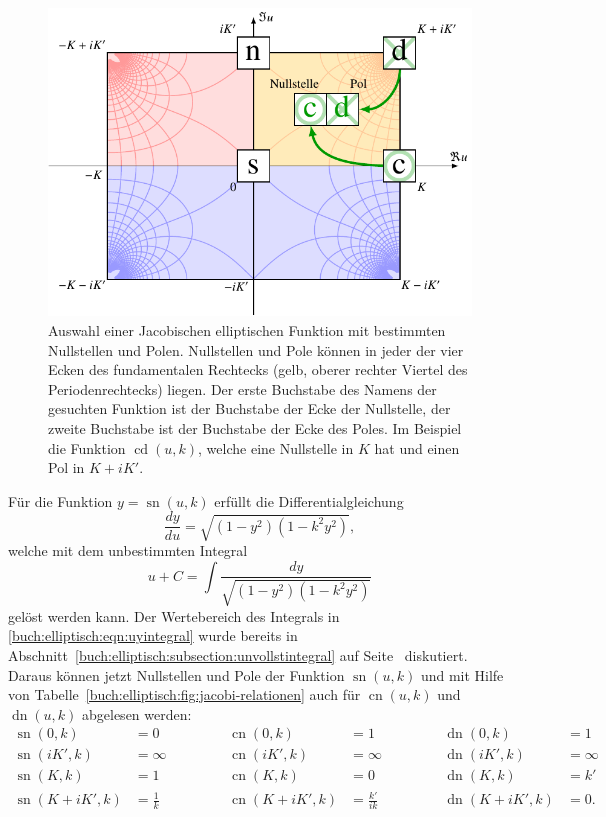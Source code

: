 \begin{figure}
\centering
\includegraphics{chapters/110-elliptisch/images/ellselection.pdf}
\caption{Auswahl einer Jacobischen elliptischen Funktion mit bestimmten
Nullstellen und Polen.
Nullstellen und Pole können in jeder der vier Ecken des fundamentalen
Rechtecks (gelb, oberer rechter Viertel des Periodenrechtecks) liegen.
Der erste Buchstabe des Namens der gesuchten Funktion ist der Buchstabe
der Ecke der Nullstelle, der zweite Buchstabe ist der Buchstabe der
Ecke des Poles.
Im Beispiel die Funktion $\operatorname{cd}(u,k)$, welche eine
Nullstelle in $K$ hat und einen Pol in $K+iK'$.
\label{buch:elliptisch:fig:selectell}}
\end{figure}
Für die Funktion $y=\operatorname{sn}(u,k)$ erfüllt die Differentialgleichung
\[
\frac{dy}{du}
=
\sqrt{(1-y^2)(1-k^2y^2)},
\]
welche mit dem unbestimmten Integral
\begin{equation}
u + C = \int\frac{dy}{\sqrt{(1-y^2)(1-k^2y^2)}}
\label{buch:elliptisch:eqn:uyintegral}
\end{equation}
gelöst werden kann.
Der Wertebereich des Integrals in \eqref{buch:elliptisch:eqn:uyintegral}
wurde bereits in
Abschnitt~\ref{buch:elliptisch:subsection:unvollstintegral}
auf Seite~\pageref{buch:elliptische:subsubsection:wertebereich}
diskutiert.
Daraus können jetzt Nullstellen und Pole der Funktion $\operatorname{sn}(u,k)$
und mit Hilfe von Tabelle~\ref{buch:elliptisch:fig:jacobi-relationen}
auch für $\operatorname{cn}(u,k)$ und $\operatorname{dn}(u,k)$
abgelesen werden:
\begin{equation}
\begin{aligned}
\operatorname{sn}(0,k)&=0
&&\qquad&
\operatorname{cn}(0,k)&=1
&&\qquad&
\operatorname{dn}(0,k)&=1
\\
\operatorname{sn}(iK',k)&=\infty
&&\qquad&
\operatorname{cn}(iK',k)&=\infty
&&\qquad&
\operatorname{dn}(iK',k)&=\infty
\\
\operatorname{sn}(K,k)&=1
&&\qquad&
\operatorname{cn}(K,k)&=0
&&\qquad&
\operatorname{dn}(K,k)&=k'
\\
\operatorname{sn}(K+iK',k)&=\frac{1}{k}
&&\qquad&
\operatorname{cn}(K+iK',k)&=\frac{k'}{ik}
&&\qquad&
\operatorname{dn}(K+iK',k)&=0.
\end{aligned}
\label{buch:elliptische:eqn:eckwerte}
\end{equation}
